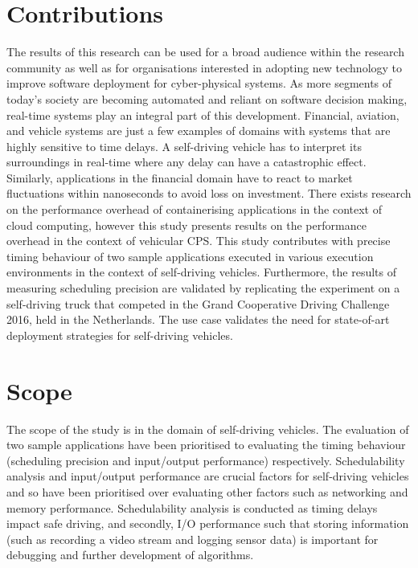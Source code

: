\section{Contributions}

The results of this research can be used for a broad audience within the research community as well as for organisations interested in adopting new technology to improve software deployment for cyber-physical systems. As more segments of today’s society are becoming automated and reliant on software decision making, real-time systems play an integral part of this development. Financial, aviation, and vehicle systems are just a few examples of domains with systems that are highly sensitive to time delays. A self-driving vehicle has to interpret its surroundings in real-time where any delay can have a catastrophic effect. Similarly, applications in the financial domain have to react to market fluctuations within nanoseconds to avoid loss on investment. There exists research on the performance overhead of containerising applications in the context of cloud computing, however this study presents results on the performance overhead in the context of vehicular CPS. This study contributes with precise timing behaviour of two sample applications executed in various execution environments in the context of self-driving vehicles. Furthermore, the results of measuring scheduling precision are validated by replicating the experiment on a self-driving truck that competed in the Grand Cooperative Driving Challenge 2016, held in the Netherlands. The use case validates the need for state-of-art deployment strategies for self-driving vehicles. 
\section{Scope}
The scope of the study is in the domain of self-driving vehicles. The evaluation of two sample applications have been prioritised to evaluating the timing behaviour (scheduling precision and input/output performance) respectively. Schedulability analysis and input/output performance are crucial factors for self-driving vehicles and so have been prioritised over evaluating other factors such as networking and memory performance. Schedulability analysis is conducted as timing delays impact safe driving, and secondly, I/O performance such that storing information (such as recording a video stream and logging sensor data) is important for debugging and further development of algorithms. 

